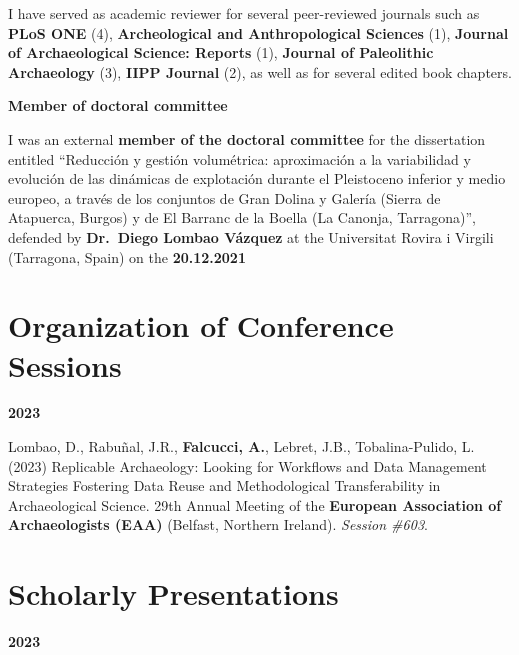 \documentclass[11pt,a4paper,]{awesome-cv}
\begin{document}
I have served as academic reviewer for several peer-reviewed journals
such as \textbf{PLoS ONE} (4), \textbf{Archeological and Anthropological
Sciences} (1), \textbf{Journal of Archaeological Science: Reports} (1),
\textbf{Journal of Paleolithic Archaeology} (3), \textbf{IIPP Journal}
(2), as well as for several edited book chapters.

\textbf{Member of doctoral committee}

I was an external \textbf{member of the doctoral committee} for the
dissertation entitled ``Reducción y gestión volumétrica: aproximación a
la variabilidad y evolución de las dinámicas de explotación durante el
Pleistoceno inferior y medio europeo, a través de los conjuntos de Gran
Dolina y Galería (Sierra de Atapuerca, Burgos) y de El Barranc de la
Boella (La Canonja, Tarragona)'', defended by \textbf{Dr.~Diego Lombao
Vázquez} at the Universitat Rovira i Virgili (Tarragona, Spain) on the
\textbf{20.12.2021}

\newpage
\setlength{\leftskip}{0cm}

\hypertarget{organization-of-conference-sessions}{%
\section{Organization of Conference
Sessions}\label{organization-of-conference-sessions}}

\setlength{\leftskip}{0cm}

\textbf{2023}

\setlength{\leftskip}{1cm}

Lombao, D., Rabuñal, J.R., \textbf{Falcucci, A.}, Lebret, J.B.,
Tobalina-Pulido, L. (2023) Replicable Archaeology: Looking for Workflows
and Data Management Strategies Fostering Data Reuse and Methodological
Transferability in Archaeological Science. 29th Annual Meeting of the
\textbf{European Association of Archaeologists (EAA)} (Belfast, Northern
Ireland). \emph{Session \#603}.

\setlength{\leftskip}{0cm}

\hypertarget{scholarly-presentations}{%
\section{Scholarly Presentations}\label{scholarly-presentations}}

\setlength{\leftskip}{0cm}

\textbf{2023}

\setlength{\leftskip}{1cm}
\end{document}
